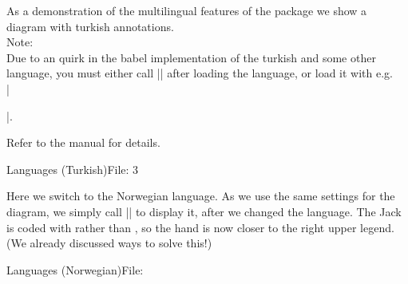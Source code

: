 \documentclass[onedown-examples]{subfiles}
\begin{document}
As a demonstration of the multilingual features of the \OneDown package we
show a diagram with turkish annotations. \\
Note:\\
Due to an quirk in the babel implementation of the turkish and some
other language, you must either call |\shorthandoff{=!}| after loading the
language, or load it with e.g.\ \\ 
|\usepackage[turkish,shorthands=]{babel}|.

Refer to the \OneDown manual for details.
\vfill
\begin{HBox}{Languages (Turkish)\hfill File: \FileName}
\leftupper{\boardtext*}%
  {\dealertext}{\vulnertext}
\rightupper[1ex]{\contract: }%
  {3\,\NT}{\by \south}
\begin{otherlanguage}{turkish}
\showAll*
\end{otherlanguage}
\end{HBox}
\vfill\noindent
Here we switch to the Norwegian language. As we use the same settings for the
diagram, we simply call |\showAll| to display it, after we changed the
language. The Jack is coded with \foreignlanguage{norsk}{\jack{}} 
rather than \jack, so the hand is now closer to the right upper legend. (We already discussed ways
to solve this!)
\vfill
%
\begin{HBox}{Languages (Norwegian)\hfill File: \FileName}
\begin{otherlanguage}{norsk}
\showAll*
\end{otherlanguage}
\end{HBox}
\vfill
%
\end{document}
